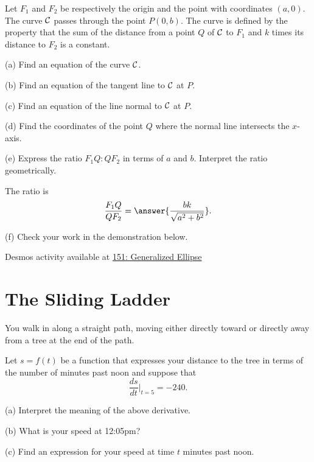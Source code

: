\documentclass{ximera}
\begin{document}
\begin{question}  \label{Q:JDJHDHD}
Let $F_1$ and $F_2$ be respectively the origin and the point with coordinates $(a,0)$. The curve ${\cal C}$ passes through the point $P(0,b)$. The curve is defined by the property that the sum of the distance from a point $Q$ of ${\cal C}$ to $F_1$ and $k$ times its distance to $F_2$ is a constant.

(a) Find an equation of the curve ${\cal C}$.

(b) Find an equation of the tangent line to ${\cal C}$ at $P$.

(c) Find an equation of the line normal to ${\cal C}$ at $P$.

(d) Find the coordinates of the point $Q$ where the normal line intersects the $x$-axis.

(e) Express the ratio $F_1 Q : Q F_2$ in terms of $a$ and $b$. Interpret the ratio geometrically.

The ratio is
\[
    \frac{F_1 Q}{Q F_2} = \answer{\frac{bk}{\sqrt{a^2+b^2}}} . 
\]

(f) Check your work in the demonstration below.

\begin{onlineOnly}
    \begin{center}
\end{center}
\end{onlineOnly}

Desmos activity available at \href{https://www.desmos.com/calculator/uz7w5uh0vl}{151: Generalized Ellipse}

\end{question}


\section*{The Sliding Ladder}
\begin{question}  \label{Q:43543554LL}
You walk in along a straight path, moving either directly toward or directly away from a tree at the end of the path.

Let $s = f(t)$ be a function that expresses your distance to the tree in terms of the number of minutes past noon and suppose that
\[
     \frac{ds}{dt}\Big|_{t=5} = -240 .
\]

(a) Interpret the meaning of the above derivative.

(b) What is your speed at 12:05pm?

(c) Find an expression for your speed at time $t$ minutes past noon.
\end{question}
\end{document}
